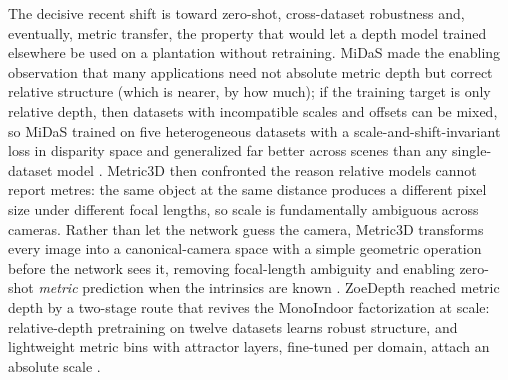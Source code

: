 The decisive recent shift is toward zero-shot, cross-dataset robustness and, eventually, metric transfer, the property that would let a depth model trained elsewhere be used on a plantation without retraining. MiDaS made the enabling observation that many applications need not absolute metric depth but correct relative structure (which is nearer, by how much); if the training target is only relative depth, then datasets with incompatible scales and offsets can be mixed, so MiDaS trained on five heterogeneous datasets with a scale-and-shift-invariant loss in disparity space and generalized far better across scenes than any single-dataset model \cite{ranftl2022midas}. Metric3D then confronted the reason relative models cannot report metres: the same object at the same distance produces a different pixel size under different focal lengths, so scale is fundamentally ambiguous across cameras. Rather than let the network guess the camera, Metric3D transforms every image into a canonical-camera space with a simple geometric operation before the network sees it, removing focal-length ambiguity and enabling zero-shot \emph{metric} prediction when the intrinsics are known \cite{yin2023metric3d}. ZoeDepth reached metric depth by a two-stage route that revives the MonoIndoor factorization at scale: relative-depth pretraining on twelve datasets learns robust structure, and lightweight metric bins with attractor layers, fine-tuned per domain, attach an absolute scale \cite{bhat2023zoedepth}.

